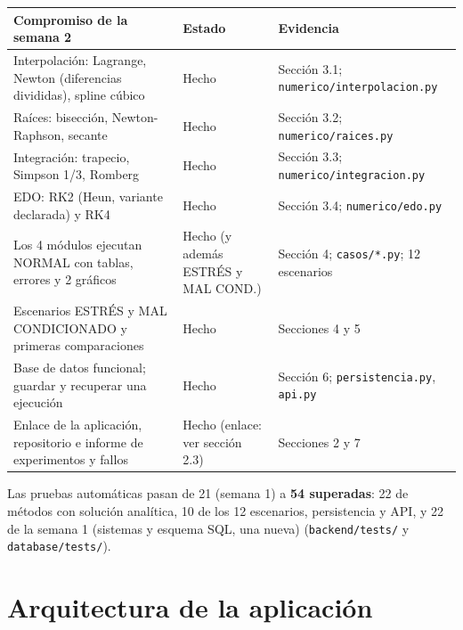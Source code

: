 \documentclass[11pt,letterpaper]{article}
\begin{document}
{\small
\begin{longtable}{p{6.0cm}p{2.6cm}p{6.6cm}}
\toprule
\textbf{Compromiso de la semana 2} & \textbf{Estado} & \textbf{Evidencia}\\
\midrule
Interpolación: Lagrange, Newton (diferencias divididas), spline cúbico & Hecho & Sección 3.1; \texttt{numerico/interpolacion.py}\\
Raíces: bisección, Newton-Raphson, secante & Hecho & Sección 3.2; \texttt{numerico/raices.py}\\
Integración: trapecio, Simpson 1/3, Romberg & Hecho & Sección 3.3; \texttt{numerico/integracion.py}\\
EDO: RK2 (Heun, variante declarada) y RK4 & Hecho & Sección 3.4; \texttt{numerico/edo.py}\\
Los 4 módulos ejecutan NORMAL con tablas, errores y 2 gráficos & Hecho (y además ESTRÉS y MAL COND.) & Sección 4; \texttt{casos/*.py}; 12 escenarios\\
Escenarios ESTRÉS y MAL CONDICIONADO y primeras comparaciones & Hecho & Secciones 4 y 5\\
Base de datos funcional; guardar y recuperar una ejecución & Hecho & Sección 6; \texttt{persistencia.py}, \texttt{api.py}\\
Enlace de la aplicación, repositorio e informe de experimentos y fallos & Hecho (enlace: ver sección 2.3) & Secciones 2 y 7\\
\bottomrule
\end{longtable}}

Las pruebas automáticas pasan de 21 (semana 1) a \textbf{54 superadas}: 22 de métodos con solución analítica, 10 de los 12 escenarios, persistencia y API, y 22 de la semana 1 (sistemas y esquema SQL, una nueva) (\texttt{backend/tests/} y \texttt{database/tests/}).

\section{Arquitectura de la aplicación}
\end{document}
